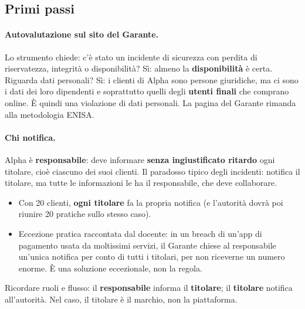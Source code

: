 \subsection{Primi passi}
\paragraph{Autovalutazione sul sito del Garante.} Lo strumento chiede: c'è stato un incidente di
sicurezza con perdita di riservatezza, integrità o disponibilità? Sì: almeno la
\textbf{disponibilità} è certa. Riguarda dati personali? Sì: i clienti di Alpha sono persone giuridiche,
ma ci sono i dati dei loro dipendenti e soprattutto quelli degli \textbf{utenti finali} che comprano
online. È quindi una violazione di dati personali. La pagina del Garante rimanda alla metodologia ENISA.

\paragraph{Chi notifica.} Alpha è \textbf{responsabile}: deve informare \textbf{senza ingiustificato
ritardo} ogni titolare, cioè ciascuno dei suoi clienti. Il paradosso tipico degli incidenti: notifica il
titolare, ma tutte le informazioni le ha il responsabile, che deve collaborare.
\begin{itemize}
  \item Con 20 clienti, \textbf{ogni titolare} fa la propria notifica (e l'autorità dovrà poi riunire
    20 pratiche sullo stesso caso).
  \item Eccezione pratica raccontata dal docente: in un breach di un'app di pagamento usata da moltissimi
    servizi, il Garante chiese al responsabile un'unica notifica per conto di tutti i titolari, per non
    riceverne un numero enorme. È una soluzione eccezionale, non la regola.
\end{itemize}

\begin{esame}
Ricordare ruoli e flusso: il \textbf{responsabile} informa il \textbf{titolare}; il \textbf{titolare}
notifica all'autorità. Nel caso, il titolare è il marchio, non la piattaforma.
\end{esame}

